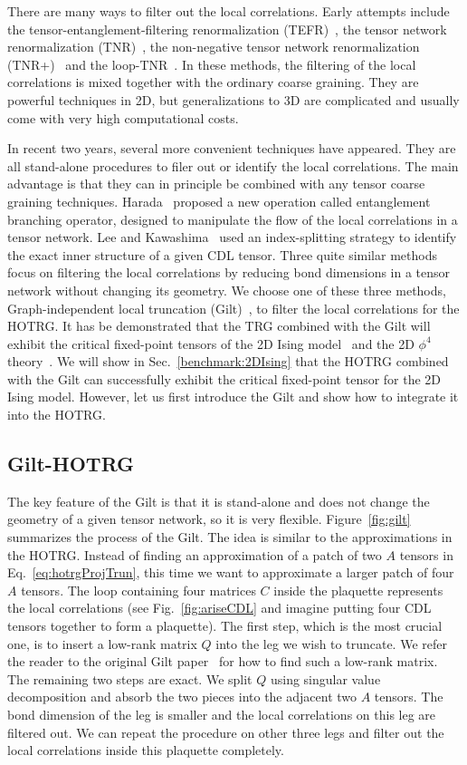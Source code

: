\documentclass[aps,prb,reprint,superscriptaddress,floatfix]{revtex4-2}
\begin{document}
There are many ways to filter out the local correlations. Early attempts
include the tensor-entanglement-filtering renormalization
(TEFR)~\cite{GuWen2009}, the tensor network renormalization
(TNR)~\cite{tnr,tnralgo}, the non-negative tensor network
renormalization (TNR+)~\cite{tnrplus} and the loop-TNR~\cite{looptnr}.
In these methods, the filtering of the local correlations is mixed
together with the ordinary coarse graining. They are powerful techniques
in 2D, but generalizations to 3D are complicated and usually come with
very high computational costs. 
%

In recent two years, several more convenient techniques have appeared.
They are all stand-alone procedures to filer out or identify the local
correlations.  The main advantage is that they can in principle be
combined with any tensor coarse graining techniques.
Harada~\cite{harada2018} proposed a new operation called entanglement
branching operator, designed to manipulate the flow of the local
correlations in a tensor network. Lee and Kawashima~\cite{tensor-ring}
used an index-splitting strategy to identify the exact inner structure
of a given CDL tensor. Three quite similar methods~\cite{tns,gilts,fet}
focus on filtering the local correlations by reducing bond dimensions in
a tensor network without changing its geometry. We choose one of these
three methods, Graph-independent local truncation (Gilt)~\cite{gilts},
to filter the local correlations for the HOTRG. It has be demonstrated
that the TRG combined with the Gilt will exhibit the critical
fixed-point tensors of the 2D Ising model~\cite{gilts} and the 2D
$\phi^4$ theory~\cite{Delcamp2020}. We will show in
Sec.~\ref{benchmark:2DIsing} that the HOTRG combined with the Gilt can
successfully exhibit the critical fixed-point tensor for the 2D Ising
model.  However, let us first introduce the Gilt and show how to
integrate it into the HOTRG.
%

\subsection{Gilt-HOTRG\label{gilt-hotrg}}
The key feature of the Gilt is that it is stand-alone and does not
change the geometry of a given tensor network, so it is very flexible.
Figure~\ref{fig:gilt} summarizes the process of the Gilt. The idea is
similar to the approximations in the HOTRG. Instead of finding an
approximation of a patch of two $A$ tensors in
Eq.~\eqref{eq:hotrgProjTrun}, this time we want to approximate a larger
patch of four $A$ tensors. The loop containing four matrices $C$ inside
the plaquette represents the local correlations (see
Fig.~\ref{fig:ariseCDL} and imagine putting four CDL tensors together to
form a plaquette). The first step, which is the most crucial one, is to
insert a low-rank matrix $Q$ into the leg we wish to truncate. We refer
the reader to the original Gilt paper~\cite{gilts} for how to find such
a low-rank matrix. The remaining two steps are exact. We split $Q$ using
singular value decomposition and absorb the two pieces into the adjacent
two $A$ tensors. The bond dimension of the leg is smaller and the local
correlations on this leg are filtered out. We can repeat the procedure
on other three legs and filter out the local correlations inside this
plaquette completely.
%
\end{document}
